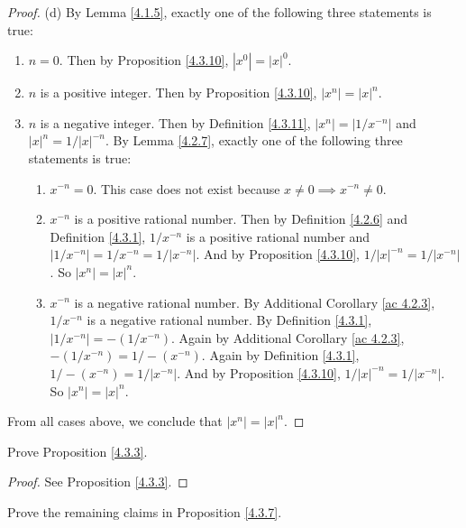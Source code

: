 \begin{proof}{(d)}
By Lemma \ref{4.1.5}, exactly one of the following three statements is true:
\begin{enumerate}[label=(\Roman*)]
    \item \(n = 0\).
    Then by Proposition \ref{4.3.10}, \(|x^0| = |x|^0\).
    \item \(n\) is a positive integer.
    Then by Proposition \ref{4.3.10}, \(|x^n| = |x|^n\).
    \item \(n\) is a negative integer.
    Then by Definition \ref{4.3.11}, \(|x^n| = |1 / x^{-n}|\) and \(|x|^n = 1 / |x|^{-n}\).
    By Lemma \ref{4.2.7}, exactly one of the following three statements is true:
    \begin{enumerate}[label=(\roman*)]
        \item \(x^{-n} = 0\).
        This case does not exist because \(x \neq 0 \implies x^{-n} \neq 0\).
        \item \(x^{-n}\) is a positive rational number.
        Then by Definition \ref{4.2.6} and Definition \ref{4.3.1}, \(1 / x^{-n}\) is a positive rational number and \(|1 / x^{-n}| = 1 / x^{-n} = 1 / |x^{-n}|\).
        And by Proposition \ref{4.3.10}, \(1 / |x|^{-n} = 1 / |x^{-n}|\).
        So \(|x^n| = |x|^n\).
        \item \(x^{-n}\) is a negative rational number.
        By Additional Corollary \ref{ac 4.2.3}, \(1 / x^{-n}\) is a negative rational number.
        By Definition \ref{4.3.1}, \(|1 / x^{-n}| = -(1 / x^{-n})\).
        Again by Additional Corollary \ref{ac 4.2.3}, \(-(1 / x^{-n}) = 1 / -(x^{-n})\).
        Again by Definition \ref{4.3.1}, \(1 / -(x^{-n}) = 1 / |x^{-n}|\).
        And by Proposition \ref{4.3.10}, \(1 / |x|^{-n} = 1 / |x^{-n}|\).
        So \(|x^n| = |x|^n\).
    \end{enumerate}
\end{enumerate}
From all cases above, we conclude that \(|x^n| = |x|^n\).
\end{proof}

\exercisesection

\begin{exercise}\label{ex 4.3.1}
Prove Proposition \ref{4.3.3}.
\end{exercise}

\begin{proof}
See Proposition \ref{4.3.3}.
\end{proof}

\begin{exercise}\label{ex 4.3.2}
Prove the remaining claims in Proposition \ref{4.3.7}.
\end{exercise}

